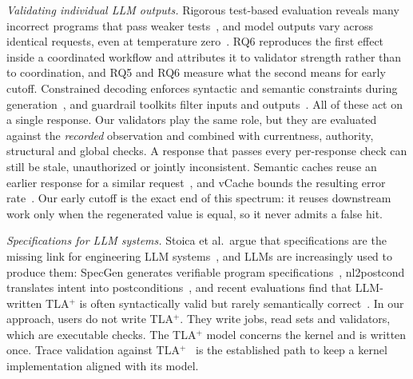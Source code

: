 \emph{Validating individual LLM outputs.} Rigorous test-based evaluation reveals many incorrect programs that pass weaker tests~\cite{evalplus}, and model outputs vary across identical requests, even at temperature zero~\cite{ouyang2025nondeterminism}. RQ6 reproduces the first effect inside a coordinated workflow and attributes it to validator strength rather than to coordination, and RQ5 and RQ6 measure what the second means for early cutoff. Constrained decoding enforces syntactic and semantic constraints during generation~\cite{synchromesh,outlines}, and guardrail toolkits filter inputs and outputs~\cite{nemoguardrails}. All of these act on a single response. Our validators play the same role, but they are evaluated against the \emph{recorded} observation and combined with currentness, authority, structural and global checks. A response that passes every per-response check can still be stale, unauthorized or jointly inconsistent. Semantic caches reuse an earlier response for a similar request~\cite{bang2023gptcache}, and vCache bounds the resulting error rate~\cite{schroeder2026vcache}. Our early cutoff is the exact end of this spectrum: it reuses downstream work only when the regenerated value is equal, so it never admits a false hit.

\emph{Specifications for LLM systems.} Stoica et al.\ argue that specifications are the missing link for engineering LLM systems~\cite{stoica2024specifications}, and LLMs are increasingly used to produce them: SpecGen generates verifiable program specifications~\cite{ma2025specgen}, nl2postcond translates intent into postconditions~\cite{endres2024nl2postcond}, and recent evaluations find that LLM-written TLA$^+$ is often syntactically valid but rarely semantically correct~\cite{bisharat2026tlallm}. In our approach, users do not write TLA$^+$. They write jobs, read sets and validators, which are executable checks. The TLA$^+$ model concerns the kernel and is written once. Trace validation against TLA$^+$~\cite{cirstea2024trace,howard2025smartcasual} is the established path to keep a kernel implementation aligned with its model.

